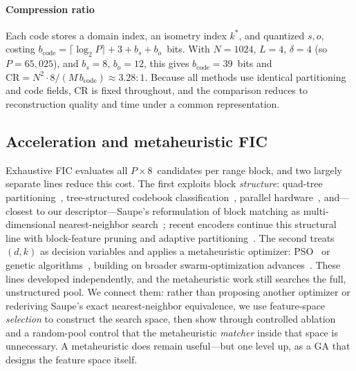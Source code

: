 \documentclass[conference, a4paper]{IEEEtran}
\begin{document}
\paragraph*{Compression ratio} Each code stores a domain index, an isometry index \mbox{$k^*$}, and quantized \mbox{$s,o$}, costing $b_{\text{code}}=\lceil\log_2 P\rceil + 3 + b_s + b_o$~bits. With \mbox{$N\!=\!1024$}, \mbox{$L\!=\!4$}, \mbox{$\delta\!=\!4$} (so \mbox{$P=65{,}025$}), and \mbox{$b_s\!=\!8$}, \mbox{$b_o\!=\!12$}, this gives \mbox{$b_{\text{code}}=39$}~bits and \mbox{$\mathrm{CR}=N^2\!\cdot\!8/(M\,b_{\text{code}})\approx3.28{:}1$}. Because all methods use identical partitioning and code fields, CR is fixed throughout, and the comparison reduces to reconstruction quality and time under a common representation.

\subsection{Acceleration and metaheuristic FIC}

Exhaustive FIC evaluates all \mbox{$P\!\times\!8$}~candidates per range block, and two largely separate lines reduce this cost. The first exploits block \emph{structure}: quad-tree partitioning~\cite{compression1995fractal}, tree-structured codebook classification~\cite{478245, hurtgen1993fast}, parallel hardware~\cite{hufnagl2000algorithms, vidya2000architecture}, and---closest to our descriptor---Saupe's reformulation of block matching as multi-dimensional nearest-neighbor search~\cite{saupe1995accelerating}; recent encoders continue this structural line with block-feature pruning and adaptive partitioning~\cite{li2024centroid, li2025partition}. The second treats \mbox{$(d,k)$} as decision variables and applies a metaheuristic optimizer: PSO~\cite{PSOFIC, PSOOriginal, eberhart1995new} or genetic algorithms~\cite{wu2007schema, wu2006spatial, mitra1998technique}, building on broader swarm-optimization advances~\cite{li2022pyramid}. These lines developed independently, and the metaheuristic work still searches the full, unstructured pool. We connect them: rather than proposing another optimizer or rederiving Saupe's exact nearest-neighbor equivalence, we use feature-space \emph{selection} to construct the search space, then show through controlled ablation and a random-pool control that the metaheuristic \emph{matcher} inside that space is unnecessary. A metaheuristic does remain useful---but one level up, as a GA that designs the feature space itself.


\end{document}
